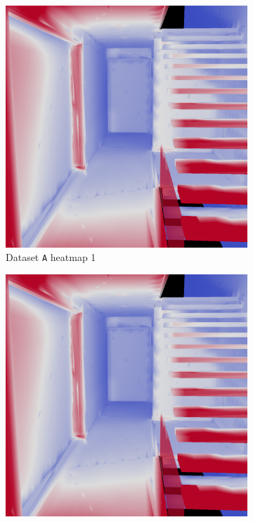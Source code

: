 \begin{figure}
	\centering
	\begin{subfigure}[t]{0.24\linewidth}
		\includegraphics[width=\textwidth]{chapters/chapter_results/correct2heatmap1}
		\caption{Dataset \texttt{A} heatmap 1}
	\end{subfigure}
	\begin{subfigure}[t]{0.24\linewidth}
		\includegraphics[width=\textwidth]{chapters/chapter_results/wrong2heatmap1}

\end{subfigure}
\end{figure}
